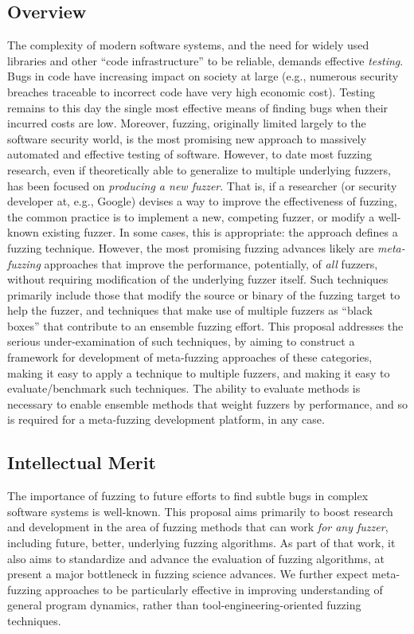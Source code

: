 \centerline{}


\cut{
}

\subsection*{Overview}
\vspace{-2mm}
The complexity of modern software systems, and the need for widely used 
libraries and other ``code infrastructure'' to be reliable, demands effective 
\emph{testing}.  Bugs in code have increasing impact on society at large (e.g., 
numerous security breaches traceable to incorrect code have very high economic 
cost).  Testing remains to this day the single most effective means of finding 
bugs when their incurred costs are low.   Moreover, fuzzing, originally limited largely to 
the software security world, is the most promising new approach to massively 
automated and effective testing of software.   However, to date most fuzzing 
research, even if theoretically able to generalize to multiple underlying 
fuzzers, has been focused on \emph{producing a new fuzzer}.  That is, if a 
researcher (or security developer at, e.g., Google) devises a way to improve 
the effectiveness of fuzzing, the common practice is to implement a new, 
competing fuzzer, or modify a well-known existing fuzzer.  In some cases, this 
is appropriate: the approach defines a fuzzing technique.  However, the most 
promising fuzzing advances likely are \emph{meta-fuzzing} approaches that 
improve the performance, potentially, of \emph{all} fuzzers, without requiring 
modification of the underlying fuzzer itself.  Such techniques primarily 
include those that modify the source or binary of the fuzzing target to help 
the fuzzer, and techniques that make use of multiple fuzzers as ``black boxes'' 
that contribute to an ensemble fuzzing effort.  This proposal addresses the 
serious under-examination of such techniques, by aiming to construct a 
framework for development of meta-fuzzing approaches of these categories, 
making it easy to apply a technique to multiple fuzzers, and making it easy to 
evaluate/benchmark such techniques.  The ability to evaluate methods is 
necessary to enable ensemble methods that weight fuzzers by performance, and so 
is required for a meta-fuzzing development platform, in any case.

\subsection*{Intellectual Merit} 
\vspace{-2mm}
The importance of fuzzing to future efforts to find subtle bugs in complex 
software systems is well-known.  This proposal aims primarily to boost research 
and development in the area of fuzzing methods that can work \emph{for any 
fuzzer}, including future, better, underlying fuzzing algorithms.  As part of 
that work, it also aims to standardize and advance the evaluation of fuzzing 
algorithms, at present a major bottleneck in fuzzing science advances.  We 
further expect meta-fuzzing approaches to be particularly effective in improving 
understanding of general program dynamics, rather than 
tool-engineering-oriented fuzzing techniques.

